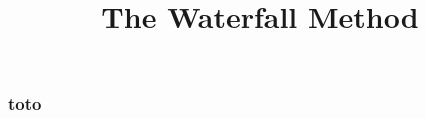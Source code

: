 \documentclass{beamer}
\title{The Waterfall Method}
\begin{document}
\begin{frame}    
    
    \maketitle

\end{frame}

\begin{frame}
    \frametitle{toto}
\end{frame}
\end{document}
